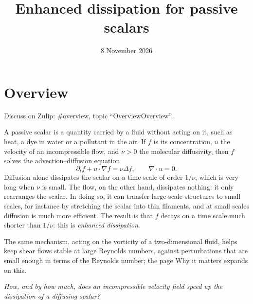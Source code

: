 \documentclass[11pt]{article}
\makeatletter
\theoremstyle{definition}
\theoremstyle{remark}
\newenvironment{note}[1][Note]{\begin{tcolorbox}[ed@note]\noindent{\itshape#1\@addpunct{.}}\enspace\ignorespaces}{\end{tcolorbox}}
\def\ed@title{}\let\ed@maketitle\maketitle\renewcommand{\maketitle}{\let\ed@title\@title\ed@maketitle}
\newcommand{\zulip}[2][]{{\par\centering\small Discuss on Zulip: \##2, topic
  ``\ifx\relax#1\relax\ed@title\else#1\fi''.\par}\medskip}
\newcommand{\wikilink}[2]{\ifx\relax#2\relax#1\else#2\fi}
\renewenvironment{quote}{\list{}{\rightmargin\leftmargin}\item\relax\centering\itshape}{\endlist}
\makeatother
\begin{document}
\title{Enhanced dissipation for passive scalars}
\author{}
\date{8 November 2026}
\maketitle
\tableofcontents

\section{Overview}\label{page-overview}
\zulip[Overview]{overview}

A passive scalar is a quantity carried by a fluid without acting on it, such as heat, a dye in water or a pollutant in the air. If $f$ is its concentration, $u$ the velocity of an incompressible flow, and $\nu>0$ the molecular diffusivity, then $f$ solves the advection–diffusion equation
\[\partial_t f+u\cdot\nabla f=\nu\Delta f,\qquad \nabla\cdot u=0.\]
Diffusion alone dissipates the scalar on a time scale of order $1/\nu$, which is very long when $\nu$ is small. The flow, on the other hand, dissipates nothing: it only rearranges the scalar. In doing so, it can transfer large-scale structures to small scales, for instance by stretching the scalar into thin filaments, and at small scales diffusion is much more efficient. The result is that $f$ decays on a time scale much shorter than $1/\nu$: this is \emph{enhanced dissipation}.

\begin{note}[Beyond passive scalars]
The same mechanism, acting on the vorticity of a two-dimensional fluid, helps keep shear flows stable at large Reynolds numbers, against perturbations that are small enough in terms of the Reynolds number; the page \wikilink{Why it matters}{} expands on this.
\end{note}

\begin{quote}
How, and by how much, does an incompressible velocity field speed up the dissipation of a diffusing scalar?
\end{quote}
\end{document}
